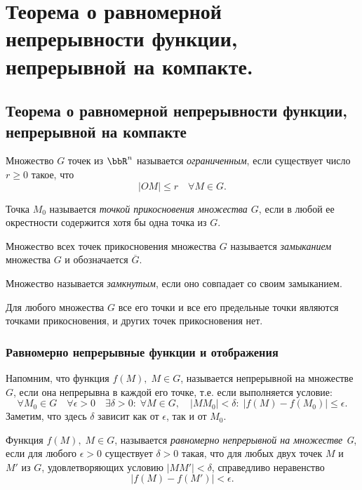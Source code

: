 \chapter[Теорема о равномерной непрерывности функции, непрерывной на компакте.]{Теорема о равномерной непрерывности функции, непрерывной на компакте.}
\section{Теорема о равномерной непрерывности функции, непрерывной на компакте}

\begin{defn}
Множество $G$ точек из $\bbR ^n$ называется \textit{ограниченным}, если существует число $r\ge 0$ такое, что
$$
|OM|\le r \quad \forall M\in G.
$$
\end{defn}

\begin{defn}
Точка $M_0$ называется \textit{точкой прикосновения множества $G$}, если в любой ее окрестности содержится хотя бы одна точка из $G$.
\end{defn}

\begin{defn}
Множество всех точек прикосновения множества $G$ называется \textit{замыканием} множества $G$ и обозначается $\overline{G}$.
\end{defn}

\begin{defn}
Множество называется \textit{замкнутым}, если оно совпадает со своим замыканием.
\end{defn}

Для любого множества $G$ все его точки и все его предельные точки являются точками прикосновения, и других точек прикосновения нет.

\subsection{Равномерно непрерывные функции и отображения}
Напомним, что функция $f(M),\;M\in G$, называется непрерывной на множестве $G$, если она непрерывна в каждой его точке, т.е. если выполняется условие:
\begin{equation}\label{yaa45e1}
\forall M_0\in G\quad \forall\epsilon>0 \quad \exists\delta>0:\;\forall M\in G,\quad |MM_0|<\delta:\;|f(M)-f(M_0)|\le\epsilon.
\end{equation}
Заметим, что здесь $\delta$ зависит как от $\epsilon$, так и от $M_0$.

\begin{defn}
Функция $f(M),\; M\in G$, называется \textit{равномерно непрерывной на множестве G}, если для любого $\epsilon>0$ существует $\delta>0$ такая, что для любых двух точек $M$ и $M'$ из $G$, удовлетворяющих условию $|MM'|<\delta$, справедливо неравенство
$$
|f(M)-f(M')|<\epsilon.
$$
\end{defn}

